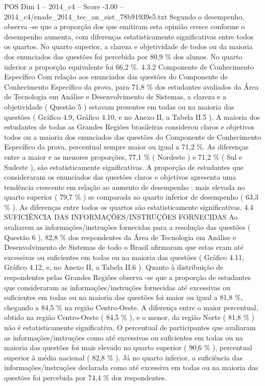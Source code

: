\begin{textsample}{POS Dim 1 – 2014\_c4 – Score -3.00 – 2014\_c4/enade\_2014\_tec\_an\_sist\_78b91939e5.txt}
Segundo o desempenho, observa -se que a proporção dos que emitiram esta opinião cresce conforme o desempenho aumenta, com diferenças estatisticamente significativas entre todos os quartos.
No quarto superior, a clareza e objetividade de todos ou da maioria dos enunciados das questões foi percebida por 80,9 \% dos alunos.
No quarto inferior a proporção equivalente foi 66,2 \%. 4.3.2 Componente de Conhecimento Específico Com relação aos enunciados das questões do Componente de Conhecimento Específico da prova, para 71,8 \% dos estudantes avaliados da Área de Tecnologia em Análise e Desenvolvimento de Sistemas, a clareza e a objetividade ( Questão 5 ) estavam presentes em todas ou na maioria das questões ( Gráfico 4.9, Gráfico 4.10, e no Anexo II, a Tabela II.5 ).
A maioria dos estudantes de todas as Grandes Regiões brasileiras considerou claros e objetivos todos ou a maioria dos enunciados das questões do Componente de Conhecimento Específico da prova, percentual sempre maior ou igual a 71,2 \%.
As diferenças entre a maior e as menores proporções, 77,1 \% ( Nordeste ) e 71,2 \% ( Sul e Sudeste ), são estatisticamente significativas.
A proporção de estudantes que consideraram os enunciados das questões claros e objetivos apresenta uma tendência crescente em relação ao aumento de desempenho : mais elevada no quarto superior ( 79,7 \% ) se comparada ao quarto inferior de desempenho ( 63,3 \% ).
As diferenças entre todos os quartos são estatisticamente significativas. 4.4 SUFICIÊNCIA DAS INFORMAÇÕES/INSTRUÇÕES FORNECIDAS Ao avaliarem as informações/instruções fornecidas para a resolução das questões ( Questão 6 ), 82,8 \% dos respondentes da Área de Tecnologia em Análise e Desenvolvimento de Sistemas de todo o Brasil afirmaram que estas eram até excessivas ou suficientes em todas ou na maioria das questões ( Gráfico 4.11, Gráfico 4.12, e, no Anexo II, a Tabela II.6 ).
Quanto à distribuição de respondentes pelas Grandes Regiões observa -se que a proporção de estudantes que consideraram as informações/instruções fornecidas até excessivas ou suficientes em todas ou na maioria das questões foi maior ou igual a 81,8 \%, chegando a 84,5 \% na região Centro-Oeste.
A diferença entre o maior percentual, obtido na região Centro-Oeste ( 84,5 \% ), e o menor, da região Norte ( 81,8 \% ) não é estatisticamente significativa.
O percentual de participantes que avaliaram as informações/instruções como até excessivas ou suficientes em todas ou na maioria das questões foi mais elevado no quarto superior ( 90,6 \% ), percentual superior à média nacional ( 82,8 \% ).
Já no quarto inferior, a suficiência das informações/instruções declarada como até excessiva em todas ou na maioria das questões foi percebida por 74,4 \% dos respondentes.

\end{textsample}
